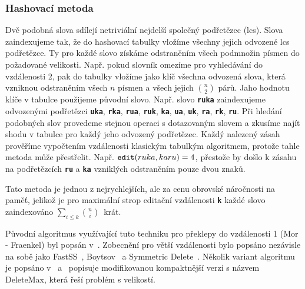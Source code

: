 \documentclass[11pt,letterpaper,oneside,openright]{book}
\newcommand{\bftt}[1]{\texttt{\textbf{#1}}}
\begin{document}
\subsubsection{Hashovací metoda}
Dvě podobná slova sdílejí netriviální nejdelší společný podřetězec (lcs). Slova
zaindexujeme tak, že do hashovací tabulky vložíme všechny jejich odvozené lcs
podřetězce. Ty pro každé slovo získáme odstraněním všech podmnožin písmen do
požadované velikosti. Např. pokud slovník omezíme pro vyhledávání do
vzdálenosti 2, pak do tabulky vložíme jako klíč všechna odvozená slova, která
vzniknou odstraněním všech $n$ písmen a všech jejich ${n \choose 2}$ párů. Jaho
hodnotu klíče v tabulce použijeme původní slovo. Např. slovo \bftt{ruka}
zaindexujeme odvozenými podřetězci \bftt{uka}, \bftt{rka}, \bftt{rua},
\bftt{ruk}, \bftt{ka}, \bftt{ua}, \bftt{uk}, \bftt{ra}, \bftt{rk}, \bftt{ru}.
Při hledání podobných slov provedeme stejnou operaci s dotazovaným slovem a
zkusíme najít shodu v tabulce pro každý jeho odvozený podřetězec. Každý
nalezený zásah prověříme vypočtením vzdálenosti klasickým tabulkým algoritmem,
protože tahle metoda může přestřelit. Např. $\bftt{edit}(ruka, karu) = 4$,
přestože by došlo k zásahu na podřetězcích \bftt{ru} a \bftt{ka} vzniklých
odstraněním pouze dvou znaků.

Tato metoda je jednou z nejrychlejších, ale za cenu obrovské náročnosti na
paměť, jelikož je pro maximální strop editační vzdálenosti \bftt{k} každé slovo
zaindexováno $\sum_{i \leq k} {n \choose i}$~krát.

Původní algoritmus  využívající tuto techniku pro překlepy do vzdálenosti 1
(Mor - Fraenkel) byl popsán v~\cite{Mor:1982:HCM:358728.358752}. Zobecnění pro
větší vzdálenosti bylo popsáno nezávisle na sobě jako FastSS~\cite{FastSS},
Boytsov~\cite{Boytsov:2011:IMA:1963190.1963191} a Symmetric
Delete~\cite{Faroo_symmetric_delete}. Několik variant algoritmu je popsáno
v~\cite{FastSS} a~\cite{Bast:2013:EFS:2457465.2457470} popisuje modifikovanou
kompaktnější verzi s názvem DeleteMax, která řeší problém s velikostí.
\end{document}
